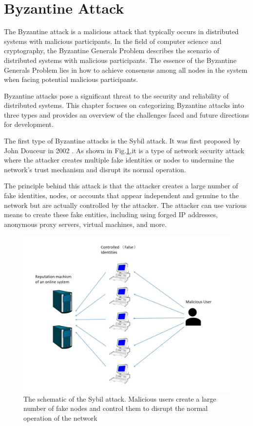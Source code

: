 \documentclass[conference]{IEEEtran}
\begin{document}
\section{Byzantine Attack}
The Byzantine attack is a malicious attack that typically occurs in distributed systems with malicious participants. 
In the field of computer science and cryptography, the Byzantine Generals Problem describes the scenario of distributed systems with malicious participants. 
The essence of the Byzantine Generals Problem lies in how to achieve consensus among all nodes in the system when facing potential malicious participants.

Byzantine attacks pose a significant threat to the security and reliability of distributed systems. 
This chapter focuses on categorizing Byzantine attacks into three types and provides an overview of the challenges faced and future directions for development.

The first type of Byzantine attacks is the Sybil attack. It was first proposed by John Douceur in 2002 \cite{b110}. 
As shown in Fig.\ref{fig12},it is a type of network security attack where the attacker creates multiple fake identities or nodes to undermine the network's trust mechanism and disrupt its normal operation.

The principle behind this attack is that the attacker creates a large number of fake identities, nodes, or accounts that appear independent and genuine to the network but are actually controlled by the attacker. 
The attacker can use various means to create these fake entities, including using forged IP addresses, anonymous proxy servers, virtual machines, and more. 

\begin{figure}[htbp]
    \centerline{\includegraphics[width=0.8\linewidth,height=0.6\linewidth]{picture/sybil.jpg}}
    \caption{The schematic of the Sybil attack. Malicious users create a large number of fake nodes and control them to disrupt the normal operation of the network}
    \label{fig12}
\end{figure}
\end{document}
